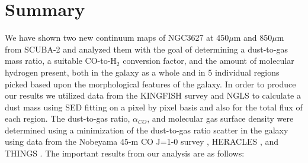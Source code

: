 \chapter{Summary}

We have shown two new continuum maps of NGC3627 at 450$\mu$m and 850$\mu$m from SCUBA-2 and analyzed them with the goal of determining a dust-to-gas mass ratio, a suitable CO-to-H$_2$ conversion factor, and the amount of molecular hydrogen present, both in the galaxy as a whole and in 5 individual regions picked based upon the morphological features of the galaxy.  In order to produce our results we utilized data from the KINGFISH survey \citep{kennicutt2011} and NGLS \citep{wilson2012} to calculate a dust mass using SED fitting on a pixel by pixel basis and also for the total flux of each region.  The dust-to-gas ratio, $\alpha_{CO}$, and molecular gas surface density were determined using a minimization of the dust-to-gas ratio scatter in the galaxy using data from the Nobeyama 45-m CO J=1-0 survey \citep{kuno2007}, HERACLES \citep{reuter1996}, and THINGS \citep{walter2008}.  The important results from our analysis are as follows:

